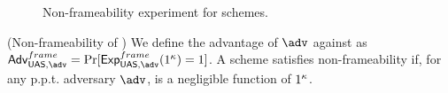 \begin{figure}[htp!]
  \caption{Non-frameability experiment for \UAS schemes.}
  \label{fig:exp-uas-frame}
\end{figure}

\begin{definition}{(Non-frameability of \GSAC)}
  We define the advantage \AdvNonframe of $\adv$ against \ExpNonframe as
  $\AdvNonframe=\Pr\lbrack\ExpNonframe(1^\secpar)=1\rbrack$.
  A \GSAC scheme satisfies non-frameability if, for any p.p.t. adversary $\adv$,
  \AdvNonframe is a negligible function of $1^\kappa$.
\end{definition}

